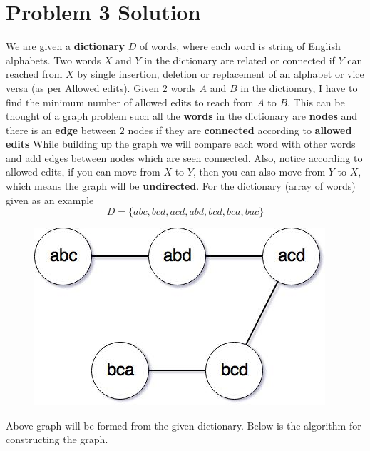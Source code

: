 \documentclass{article}
\let\bold\textbf
\begin{document}
\section{Problem 3 Solution}{
  We are given a \bold{dictionary} $D$ of words, where each word is string of English alphabets. \newline
  Two words $X$ and $Y$ in the dictionary are related or connected if $Y$ can reached from $X$ by single insertion, deletion or replacement of an alphabet or vice versa (as per Allowed edits). \newline
  Given $2$ words $A$ and $B$ in the dictionary, I have to find the minimum number of allowed edits to reach from $A$ to $B$. \newline
  \newline This can be thought of a graph problem such all the \bold{words} in the dictionary are \bold{nodes} and there is an \bold{edge} between $2$ nodes if they are \bold{connected} according to \bold{allowed edits}
  \newline While building up the graph we will compare each word with other words and add edges between nodes which are seen connected. \newline
  Also, notice according to allowed edits, if you can move from $X$ to $Y$, then you can also move from $Y$ to $X$, which means the graph will be \bold{undirected}. \newline
  For the dictionary (array of words) given as an example $$D=\{abc,bcd,acd,abd,bcd,bca,bac\}$$
  \begin{figure}[h]
    \centering
    \includegraphics[scale=0.4]{alphabet}
  \end{figure}
  \newline Above graph will be formed from the given dictionary.
  \newline Below is the algorithm for constructing the graph.
  \begin{algorithm}

\end{algorithm}}
\end{document}

